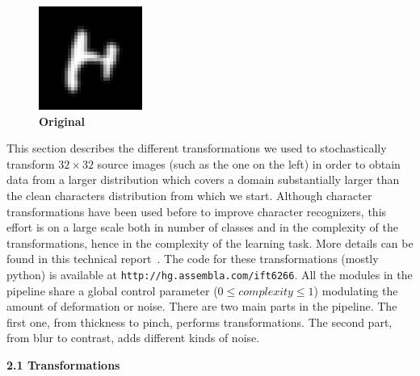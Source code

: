 \documentclass{article} %
\begin{document}
\begin{figure}
\vspace*{-5mm}
\begin{center}
\includegraphics[scale=.4]{images/Original.png}\\
{\bf Original}
\end{center}
\end{figure}
This section describes the different transformations we used to stochastically
transform $32 \times 32$ source images (such as the one on the left)
in order to obtain data from a larger distribution which
covers a domain substantially larger than the clean characters distribution from
which we start.
Although character transformations have been used before to
improve character recognizers, this effort is on a large scale both
in number of classes and in the complexity of the transformations, hence
in the complexity of the learning task.
More details can
be found in this technical report~\citep{ARXIV-2010}.
The code for these transformations (mostly python) is available at 
{\tt http://hg.assembla.com/ift6266}. All the modules in the pipeline share
a global control parameter ($0 \le complexity \le 1$) modulating the
amount of deformation or noise. 
There are two main parts in the pipeline. The first one,
from thickness to pinch, performs transformations. The second
part, from blur to contrast, adds different kinds of noise.

\vspace*{1mm}
{\large\bf 2.1 Transformations}
\vspace*{1mm}
\end{document}
